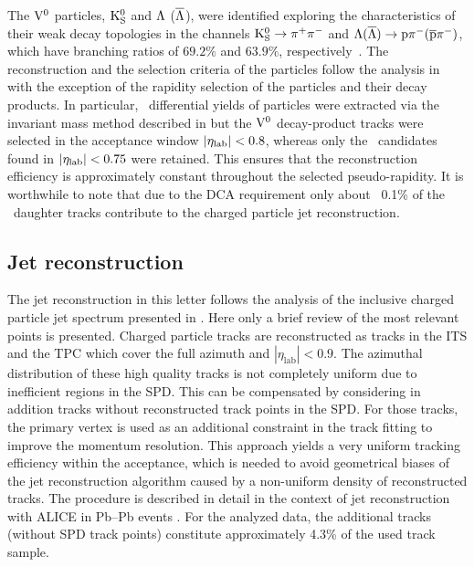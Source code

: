The ${\rm V}^{0}$ particles, $\rm{K}^{0}_{\rm S}$ and $\Lambda$ ($\overline{\Lambda}$), were identified exploring the characteristics of their weak decay topologies in the channels $\rm{K}^{0}_{\rm S}\to\pi^{+}\pi^{-}$ and $\Lambda(\overline{\Lambda})\to{\rm p}\pi^{-}(\overline{\rm p}\pi^{-})$, which have branching ratios of $69.2\%$ and $63.9\%$, respectively~\cite{Agashe:2014kda}.
The reconstruction and the selection criteria of the \Vzero particles follow the analysis in \cite{Abelev:2013haa} with the exception of the rapidity selection of the particles and their decay products.
In particular, \pt\ differential yields of \Vzero particles were extracted via the invariant mass method described in \cite{Abelev:2013haa} but the ${\rm V}^{0}$ decay-product tracks were selected in the acceptance window $\left|\eta_{\rm lab}\right|<0.8$, whereas only the \Vzero\ candidates found in $\left|\eta_{\rm lab}\right|<0.75$ were retained. 
This ensures that the reconstruction efficiency is approximately constant throughout the selected pseudo-rapidity. 
It is worthwhile to note that due to the DCA requirement only about ~0.1\% of the \Vzero\ daughter tracks contribute to the charged particle jet reconstruction.


\subsection{Jet reconstruction}

The jet reconstruction in this letter follows the analysis of the inclusive charged particle jet spectrum presented in \cite{Adam:2015hoa}. Here only a brief review of the most relevant points is presented.
Charged particle tracks are reconstructed as tracks in the ITS and the TPC which cover the full azimuth and $|\eta_\mathrm{lab}| < 0.9$. 
The azimuthal distribution of these high quality tracks is not completely uniform due to inefficient regions in the SPD. This can be compensated by considering in addition tracks without reconstructed track points in the SPD. 
For those tracks, the primary vertex is used as an additional constraint in the track fitting to improve the momentum resolution. 
This approach yields a very uniform tracking efficiency within the acceptance, which is needed to avoid geometrical biases of the jet reconstruction algorithm caused by a non-uniform
density of reconstructed tracks. 
The procedure is described in detail in the context of jet reconstruction with ALICE in Pb–Pb events  \cite{Adam:2015hoa}. For the analyzed data, the additional tracks (without SPD track points) constitute approximately 4.3\% of the used track sample.

